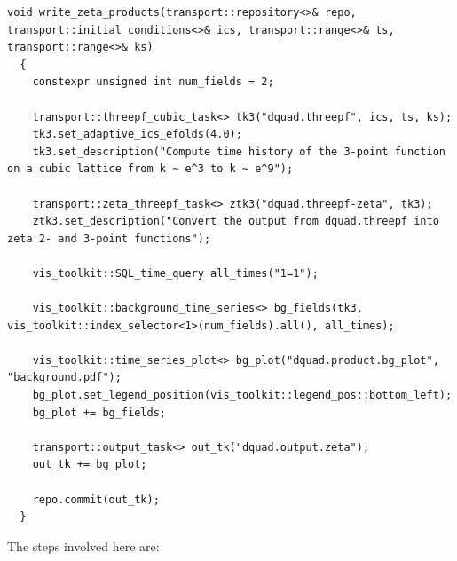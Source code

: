 \documentclass[11pt,a4paper]{article}
\begin{document}
\begin{verbatim}
void write_zeta_products(transport::repository<>& repo, transport::initial_conditions<>& ics, transport::range<>& ts, transport::range<>& ks)
  {
	constexpr unsigned int num_fields = 2;

    transport::threepf_cubic_task<> tk3("dquad.threepf", ics, ts, ks);
    tk3.set_adaptive_ics_efolds(4.0);
    tk3.set_description("Compute time history of the 3-point function on a cubic lattice from k ~ e^3 to k ~ e^9");

    transport::zeta_threepf_task<> ztk3("dquad.threepf-zeta", tk3);
    ztk3.set_description("Convert the output from dquad.threepf into zeta 2- and 3-point functions");

    vis_toolkit::SQL_time_query all_times("1=1");

    vis_toolkit::background_time_series<> bg_fields(tk3, vis_toolkit::index_selector<1>(num_fields).all(), all_times);

    vis_toolkit::time_series_plot<> bg_plot("dquad.product.bg_plot", "background.pdf");
    bg_plot.set_legend_position(vis_toolkit::legend_pos::bottom_left);
    bg_plot += bg_fields;

    transport::output_task<> out_tk("dquad.output.zeta");
    out_tk += bg_plot;

    repo.commit(out_tk);
  }
\end{verbatim}
The steps involved here are:
\end{document}
